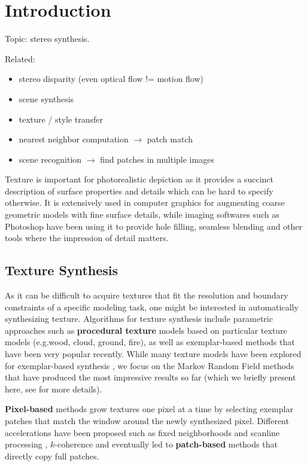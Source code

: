 

\section{Introduction}

Topic: stereo synthesis.

Related:
\begin{itemize}
	\item stereo disparity (even optical flow != motion flow)
	\item scene synthesis
	\item texture / style transfer
	\item nearest neighbor computation $\to$ patch match
	\item scene recognition $\to$ find patches in multiple images
\end{itemize}

Texture is important for photorealistic depiction as it provides a succinct description of surface properties and details which can be hard to specify otherwise.
It is extensively used in computer graphics for augmenting coarse geometric models with fine surface details, while imaging softwares such as Photoshop have been using it to provide hole filling, seamless blending and other tools where the impression of detail matters.

\subsection{Texture Synthesis}

As it can be difficult to acquire textures that fit the resolution and boundary constraints of a specific modeling task, one might be interested in automatically synthesizing texture.
Algorithms for texture synthesis include parametric approaches such as \textbf{procedural texture} models \cite{Ebert02, Musgrave93, Worley96} based on particular texture models (e.g.\;wood, cloud, ground, fire), as well as exemplar-based methods that have been very popular recently.
While many texture models have been explored for exemplar-based synthesis \cite{Heeger95}, we focus on the Markov Random Field methods that have produced the most impressive results so far (which we briefly present here, see \cite{Wei09} for more details).

\textbf{Pixel-based} methods \cite{Efros99} grow textures one pixel at a time by selecting exemplar patches that match the window around the newly synthesized pixel.
Different accelerations have been proposed such as fixed neighborhoods and scanline processing \cite{Wei00}, $k$-coherence \cite{Tong02} and eventually led to \textbf{patch-based} methods \cite{Praun00, Efros01, Liang01, Kwatra03} that directly copy full patches.

